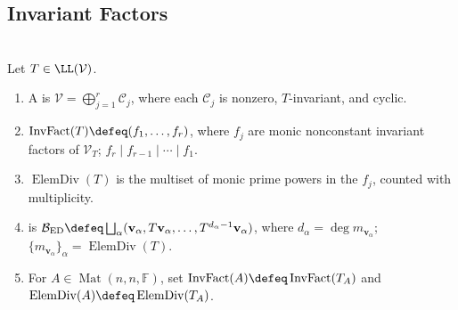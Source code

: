 \subsection{Invariant Factors}

\begin{definition} \label{def:operator-invariant-factors-elementary-divisors} \\
Let $T\in\LL(\mathcal{V})$.
\begin{enumerate}[label=(\roman*)]
\setlength{\itemsep}{0pt}
\item A  is $\mathcal{V}=\bigoplus_{j=1}^r\mathcal{C}_j$, where each $\mathcal{C}_j$ is nonzero, $T$-invariant, and cyclic.
\item $\operatorname{InvFact}(T)\defeq(f_1,\ldots,f_r)$, where $f_j$ are monic nonconstant invariant factors of $\mathcal{V}_T$; $f_r\mid f_{r-1}\mid\cdots\mid f_1$.
\item $\operatorname{ElemDiv}(T)$ is the multiset of monic prime powers in the $f_j$, counted with multiplicity.
\item {} is $\mathcal{B}_{\operatorname{ED}}\defeq\bigsqcup_{\alpha}(\mathbf{v}_{\alpha},T\mathbf{v}_{\alpha},\ldots,T^{d_{\alpha}-1}\mathbf{v}_{\alpha})$, where $d_{\alpha}=\deg m_{\mathbf{v}_{\alpha}}$; $\{m_{\mathbf{v}_{\alpha}}\}_{\alpha}=\operatorname{ElemDiv}(T)$.
\item For $A\in\operatorname{Mat}(n,n,\mathbb{F})$, set $\operatorname{InvFact}(A)\defeq\operatorname{InvFact}(T_A)$ and $\operatorname{ElemDiv}(A)\defeq\operatorname{ElemDiv}(T_A)$.
\end{enumerate}
\end{definition}

